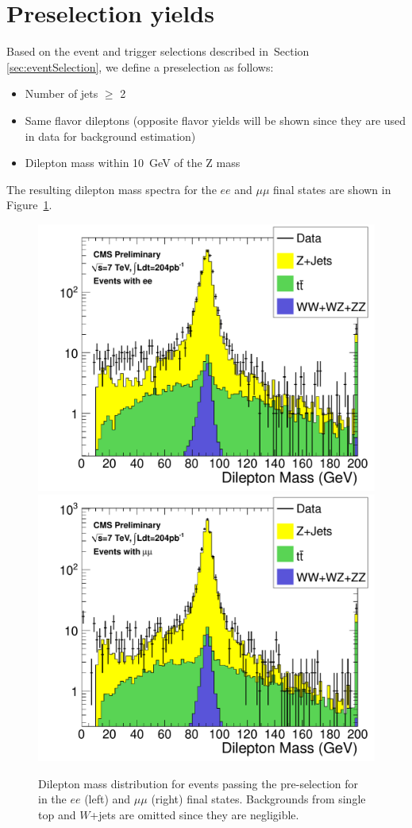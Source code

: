 \section{Preselection yields}
\label{sec:yields}

Based on the event and trigger selections described in~Section \ref{sec:eventSelection}, 
we define a preselection as follows:
\begin{itemize}
\item Number of jets $\geq$ 2
\item Same flavor dileptons (opposite flavor yields will be shown since 
  they are used in data for \ttbar background estimation)
\item Dilepton mass within 10~GeV of the Z mass
\end{itemize}
The resulting dilepton mass spectra for the $ee$ and $\mu\mu$ final states are shown in Figure~\ref{fig:dilmass}.


\begin{figure}[hbt]
  \begin{center}
	\includegraphics[width=0.48\linewidth]{plots/hdilmass_ee_allj.pdf}
	\includegraphics[width=0.48\linewidth]{plots/hdilmass_mm_allj.pdf}
	\caption{
	  \label{fig:dilmass}\protect 
	  Dilepton mass distribution for events passing the pre-selection for \lumi~
	  in the $ee$ (left) and $\mu\mu$ (right) final states. Backgrounds from 
	  single top and $W$+jets are omitted
	  since they are negligible.}
  \end{center}
\end{figure}


